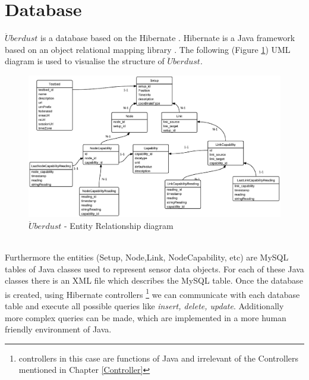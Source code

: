 \documentclass[12pt,a4paper]{report}
\begin{document}
\section{Database}
%
$\ddot{U}berdust$ is a database based on the Hibernate \cite{website:hibernate}. Hibernate is a Java framework based on an object relational mapping library \cite{website:hibernate-wiki}. The following (Figure \ref{uberdust-uml}) UML diagram is used to visualise the structure of $\ddot{U}berdust$.
%
\begin{figure}[H]
\centering
\includegraphics*[width=\textwidth]{wisedb2}
\caption{$\ddot{U}berdust$ - Entity Relationship diagram}
\label{uberdust-uml}
\end{figure}
\ \\
Furthermore the entities (Setup, Node,Link, NodeCapability, etc) are MySQL tables of Java classes used to represent sensor data objects.
For each of these Java classes there is an XML file which describes the MySQL table.
Once the database is created, using Hibernate controllers \footnote{controllers in this case are functions of Java and irrelevant of the Controllers mentioned in Chapter \ref{Controller}} we can communicate with each database table and execute all possible queries like \textit{insert, delete, update}.
Additionally more complex queries can be made, which are implemented in a more human friendly environment of Java.
%
\newpage
%
\end{document}
